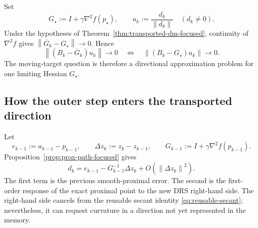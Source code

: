 \documentclass[10pt,leqno]{amsart}
\numberwithin{equation}{section}
\numberwithin{algorithm}{section}
\theoremstyle{remark}
\newcommand{\norm}[1]{\left\lVert #1 \right\rVert}
\newcommand{\grad}{\nabla}
\begin{document}
Set
\begin{equation}
\label{eq:dm-coverage-Gstar}
    G_\star:=I+\gamma\grad^2f(p_\star),
    \qquad
    u_k:=\frac{d_k}{\norm{d_k}}
    \quad(d_k\ne0).
\end{equation}
Under the hypotheses of Theorem~\ref{thm:transported-dm-focused}, continuity of $\grad^2f$ gives $\norm{\overline G_k-G_\star}\to0$.  Hence
\begin{equation}
\label{eq:dm-equivalent-fixed-Hessian}
    \norm{(B_k-\overline G_k)u_k}\to0
    \quad\Longleftrightarrow\quad
    \norm{(B_k-G_\star)u_k}\to0.
\end{equation}
The moving-target question is therefore a directional approximation problem for one limiting Hessian $G_\star$.

\subsection{How the outer step enters the transported direction}

Let
\[
    e_{k-1}:=a_{k-1}-p_{k-1},
    \qquad
    \Delta z_k:=z_k-z_{k-1},
    \qquad
    G_{k-1}:=I+\gamma\grad^2f(p_{k-1}).
\]
Proposition~\ref{prop:prox-path-focused} gives
\begin{equation}
\label{eq:dm-direction-decomposition}
    d_k
    =e_{k-1}-G_{k-1}^{-1}\Delta z_k
      +O(\norm{\Delta z_k}^2).
\end{equation}
The first term is the previous smooth-proximal error.  The second is the first-order response of the exact proximal point to the new DRS right-hand side.  The right-hand side cancels from the reusable secant identity \eqref{eq:reusable-secant}; nevertheless, it can request curvature in a direction not yet represented in the memory.
\end{document}
